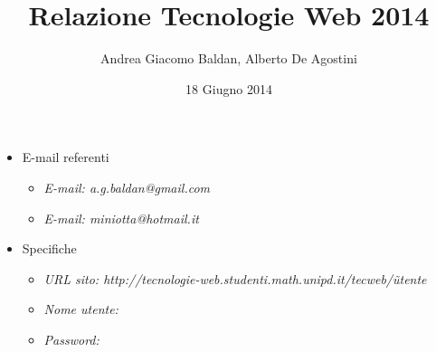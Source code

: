 \documentclass[a4paper, 12pt]{article}
\title{Relazione Tecnologie Web 2014}
\author{Andrea Giacomo Baldan, Alberto De Agostini}
\date{18 Giugno 2014}
\begin{document}
\maketitle

\begin{itemize}
\item E-mail referenti
  \begin{itemize}
  \item \emph{E-mail: a.g.baldan@gmail.com}
  \item \emph{E-mail: miniotta@hotmail.it}
  \end{itemize}
\item Specifiche
  \begin{itemize}
  \item \emph{URL sito: http://tecnologie-web.studenti.math.unipd.it/tecweb/\~utente}
  \item \emph{Nome utente: }
  \item \emph{Password: }
  \end{itemize}
\end{itemize}


%
%

\end{document}
